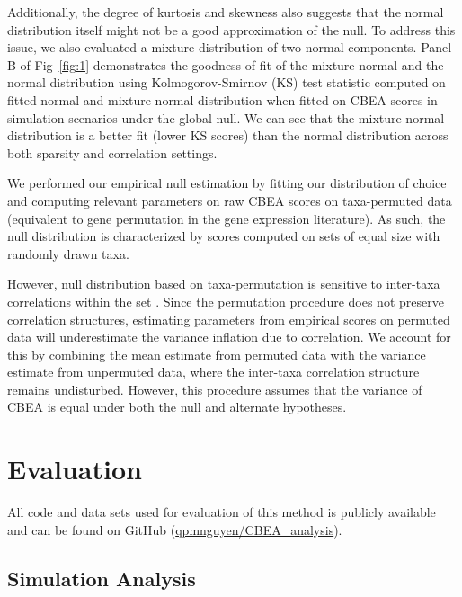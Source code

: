 \documentclass[10pt,letterpaper]{article}
\begin{document}
Additionally, the degree of kurtosis and skewness also suggests that the normal distribution itself might not be a good approximation of the null. To address this issue, we also evaluated a mixture distribution of two normal components. Panel B of Fig~\ref{fig:1} demonstrates the goodness of fit of the mixture normal and the normal distribution using Kolmogorov-Smirnov (KS) test statistic computed on fitted normal and mixture normal distribution when fitted on CBEA scores in simulation scenarios under the global null. We can see that the mixture normal distribution is a better fit (lower KS scores) than the normal distribution across both sparsity and correlation settings. 

We performed our empirical null estimation by fitting our distribution of choice and computing relevant parameters on raw CBEA scores on taxa-permuted data (equivalent to gene permutation in the gene expression literature). As such, the null distribution is characterized by scores computed on sets of equal size with randomly drawn taxa. 

However, null distribution based on taxa-permutation is sensitive to inter-taxa correlations within the set \cite{wu2012}. Since the permutation procedure does not preserve correlation structures, estimating parameters from empirical scores on permuted data will underestimate the variance inflation due to correlation. We account for this by combining the mean estimate from permuted data with the variance estimate from unpermuted data, where the inter-taxa correlation structure remains undisturbed. However, this procedure assumes that the variance of CBEA is equal under both the null and alternate hypotheses. 

\section*{Evaluation}
All code and data sets used for evaluation of this method is publicly available and can be found on GitHub (\href{www.github.com/qpmnguyen/CBEA\_analysis}{qpmnguyen/CBEA\_analysis}). 

\subsection*{Simulation Analysis}
\end{document}
